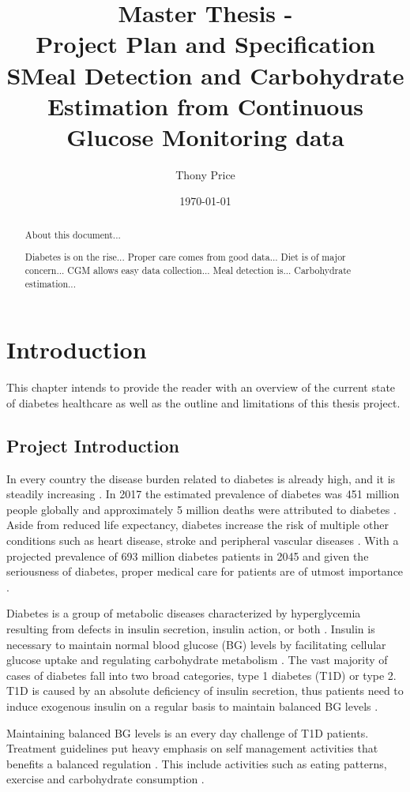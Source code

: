 \documentclass{kththesis}
\title{%
    Master Thesis - \\
    Project Plan and Specification \\
    \vspace{.5em}
    \large SMeal Detection and Carbohydrate Estimation from Continuous Glucose Monitoring data \\
}
\author{Thony Price}
\date{\today}
\begin{document}
\frontmatter
\titlepage

\begin{abstract}
  About this document...

  Diabetes is on the rise...
  Proper care comes from good data...
  Diet is of major concern...
  CGM allows easy data collection...
  Meal detection is...
  Carbohydrate estimation...
\end{abstract}

\tableofcontents
\mainmatter

\chapter{Introduction}

This chapter intends to provide the reader with an overview of the current state of diabetes healthcare as well as the outline and limitations of this thesis project.

\section{Project Introduction}

In every country the disease burden related to diabetes is already high, and it is steadily increasing \parencite{Forouhi2014}.
In 2017 the estimated prevalence of diabetes was 451 million people globally and approximately 5 million deaths were attributed to diabetes \parencite{Cho2018}.
Aside from reduced life expectancy, diabetes increase the risk of multiple other conditions such as heart disease, stroke and peripheral vascular diseases \parencite{Forouhi2014}.
With a projected prevalence of 693 million diabetes patients in 2045 and given the seriousness of diabetes, proper medical care for patients are of utmost importance \parencite{Cho2018}.

Diabetes is a group of metabolic diseases characterized by hyperglycemia resulting from defects in insulin secretion, insulin action, or both \parencite{ADA2010}.
Insulin is necessary to maintain normal blood glucose (BG) levels by facilitating cellular glucose uptake and regulating carbohydrate metabolism \parencite{Wilcox2005}.
The vast majority of cases of diabetes fall into two broad categories, type 1 diabetes (T1D) or type 2.
T1D is caused by an absolute deficiency of insulin secretion, thus
patients need to induce exogenous insulin on a regular basis to maintain balanced BG levels \parencite{ADA2010}.

Maintaining balanced BG levels is an every day challenge of T1D patients.
Treatment guidelines put heavy emphasis on self management activities that benefits a balanced regulation \parencite{Cooke2013}.
This include activities such as eating patterns, exercise and carbohydrate consumption \parencite{Cooke2013}.
\end{document}
